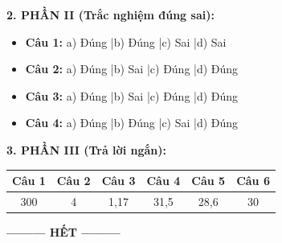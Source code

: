 \documentclass[12pt,a4paper]{article}
\begin{document}
\noindent
\textbf{2. PHẦN II (Trắc nghiệm đúng sai):}
\begin{itemize}
	\item \textbf{Câu 1:} a) Đúng \quad|\quad b) Đúng \quad|\quad c) Sai \quad|\quad d) Sai
	\item \textbf{Câu 2:} a) Đúng \quad|\quad b) Sai \quad|\quad c) Đúng \quad|\quad d) Đúng
	\item \textbf{Câu 3:} a) Đúng \quad|\quad b) Sai \quad|\quad c) Đúng \quad|\quad d) Đúng
	\item \textbf{Câu 4:} a) Đúng \quad|\quad b) Đúng \quad|\quad c) Sai \quad|\quad d) Đúng
\end{itemize}

\noindent
\textbf{3. PHẦN III (Trả lời ngắn):}
\begin{center}
\begin{tabular}{|c|c|c|c|c|c|}
\hline
\textbf{Câu 1} & \textbf{Câu 2} & \textbf{Câu 3} & \textbf{Câu 4} & \textbf{Câu 5} & \textbf{Câu 6} \\ \hline
300 & 4 & 1,17 & 31,5 & 28,6 & 30 \\ \hline
\end{tabular}
\end{center}

\begin{center}
\textbf{--------- HẾT ---------}
\end{center}
\end{document}
